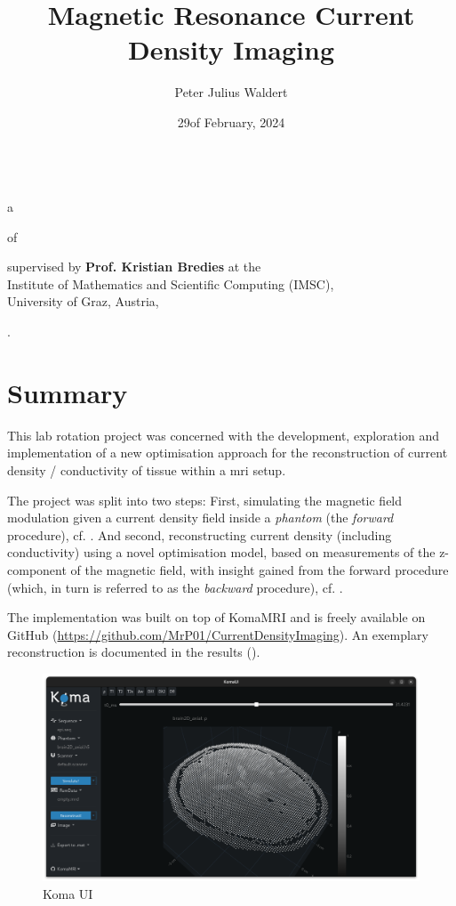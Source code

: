 \documentclass[12pt]{article}
\title{Magnetic Resonance Current Density Imaging}
\author{Peter Julius Waldert}
\date{29\th of February, 2024}
\begin{document}
  \makeatletter
  \begin{center}
    {\Huge \@title} \\
    a\hspace{.4em}{\large BioTechMed-Graz Lab Rotation Report}
    \vspace{.5cm}

    of\hspace{.5em}{\large \@author}
    \vspace{.3cm}

    supervised by \textbf{Prof. Kristian Bredies} at the \\
    Institute of Mathematics and Scientific Computing (IMSC), \\
    University of Graz, Austria,
    \vspace{.3cm}

    {\@date}.
  \end{center}
  \makeatother

  \section{Summary}
  This lab rotation project was concerned with the development, exploration and implementation of a new optimisation approach for the reconstruction of current density / conductivity of tissue within a \gls{mri} setup.

  The project was split into two steps: First, simulating the magnetic field modulation given a current density field inside a \textit{phantom} (the \textit{forward} procedure), cf. .
  And second, reconstructing current density (including conductivity) using a novel optimisation model, based on measurements of the z-component of the magnetic field, with insight gained from the forward procedure (which, in turn is referred to as the \textit{backward} procedure), cf. .

  The implementation was built on top of KomaMRI \parencite{2022-koma-mri} and is freely available on GitHub (\url{https://github.com/MrP01/CurrentDensityImaging}).
  An exemplary reconstruction is documented in the results ().

  \begin{figure}[H]
    \centering
    \includegraphics[width=\linewidth]{../figures/komaui.png}
    \caption{Koma UI}
    \label{fig:komaui}
  \end{figure}
\end{document}
